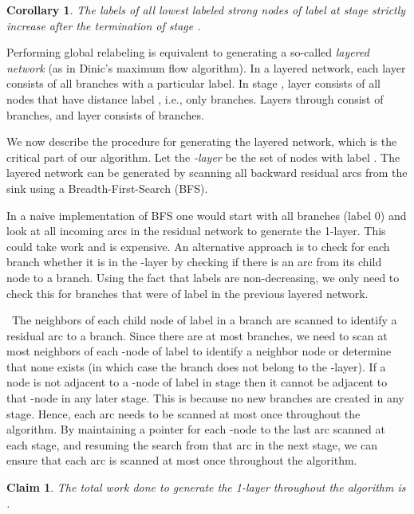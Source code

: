 \documentclass{article}
\newtheorem{corollary}{Corollary}[section]
\newtheorem{claim}{Claim}[section]
\begin{document}
\begin{corollary}
\label{lem:increasinglabel}
The labels of all lowest labeled strong nodes of label  at stage  strictly increase after the termination of stage .
\end{corollary}

Performing global relabeling is equivalent to generating a so-called {\em layered network} (as in Dinic's maximum flow algorithm). In a layered network, each layer consists of all branches with a particular label. In stage , layer  consists of all nodes that have distance label , i.e., only  branches.  Layers  through  consist of  branches, and layer  consists of  branches.

We now describe the procedure for generating the layered network, which is the critical part of our algorithm.  Let the {\em -layer}  be the set of nodes with label .  The layered network can be generated by scanning all backward residual arcs from the sink using a Breadth-First-Search (BFS).

In a naive implementation of BFS one would start with all  branches (label 0) and look at all incoming arcs in the residual network to generate the 1-layer. This could take  work and is expensive.   An alternative approach is to check for each  branch whether it is in the -layer by checking if there is an arc from its child node to a  branch. Using the fact that labels are non-decreasing, we only need to check this for  branches that were of label  in the previous layered network. \medskip

~The neighbors of each  child node of label  in a  branch are scanned to identify a residual arc to a  branch. Since there are at most   branches, we need to scan at most  neighbors of each -node of label  to identify a  neighbor node or determine that none exists (in which case the branch does not belong to the -layer). If a  node is not adjacent to a -node of label  in stage  then it cannot be adjacent to that -node in any later stage.  This is because no new  branches are created in any stage.  Hence, each arc needs to be scanned at most once throughout the algorithm. By maintaining a pointer for each -node to the last arc scanned at each stage, and resuming the search from that arc in the next stage, we can ensure that each arc is scanned at most once throughout the algorithm.

\begin{claim}
The total work done to generate the 1-layer {\em throughout the algorithm} is .
\end{claim}
\end{document}

